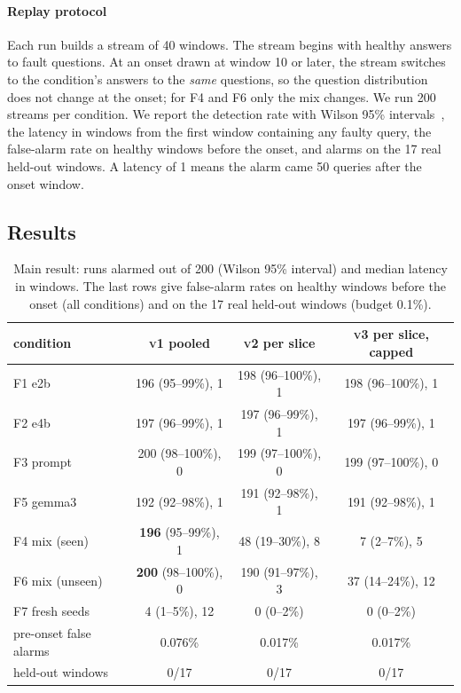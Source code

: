 \documentclass[11pt]{article}
\newcommand{\vone}{\textsc{v1}}
\newcommand{\vtwo}{\textsc{v2}}
\newcommand{\vthree}{\textsc{v3}}
\begin{document}
\paragraph{Replay protocol}
Each run builds a stream of 40 windows. The stream begins with healthy answers to
fault questions. At an onset drawn at window 10 or later, the stream switches to
the condition's answers to the \emph{same} questions, so the question
distribution does not change at the onset; for F4 and F6 only the mix changes.
We run 200 streams per condition. We report the detection rate with Wilson 95\%
intervals~\citep{wilson1927probable}, the latency in windows from the first window
containing any faulty query, the false-alarm rate on healthy windows before the
onset, and alarms on the 17 real held-out windows. A latency of 1 means the alarm
came 50 queries after the onset window.

\subsection{Results}
\label{app:fixed-results}

\begin{table}[t]
  \centering\small
  \caption{Main result: runs alarmed out of 200 (Wilson 95\% interval) and median
  latency in windows. The last rows give false-alarm rates on healthy windows before
  the onset (all conditions) and on the 17 real held-out windows (budget 0.1\%).}
  \label{tab:main}
  \setlength{\tabcolsep}{5pt}
  \begin{tabular}{lccc}
    \toprule
    condition & \vone{} pooled & \vtwo{} per slice & \vthree{} per slice, capped \\
    \midrule
    F1 e2b & 196 (95--99\%), 1 & 198 (96--100\%), 1 & 198 (96--100\%), 1 \\
    F2 e4b & 197 (96--99\%), 1 & 197 (96--99\%), 1 & 197 (96--99\%), 1 \\
    F3 prompt & 200 (98--100\%), 0 & 199 (97--100\%), 0 & 199 (97--100\%), 0 \\
    F5 gemma3 & 192 (92--98\%), 1 & 191 (92--98\%), 1 & 191 (92--98\%), 1 \\
    \midrule
    F4 mix (seen) & \textbf{196} (95--99\%), 1 & 48 (19--30\%), 8 & 7 (2--7\%), 5 \\
    F6 mix (unseen) & \textbf{200} (98--100\%), 0 & 190 (91--97\%), 3 & 37 (14--24\%), 12 \\
    F7 fresh seeds & 4 (1--5\%), 12 & 0 (0--2\%) & 0 (0--2\%) \\
    \midrule
    pre-onset false alarms & 0.076\% & 0.017\% & 0.017\% \\
    held-out windows & 0/17 & 0/17 & 0/17 \\
    \bottomrule
  \end{tabular}
\end{table}
\end{document}
